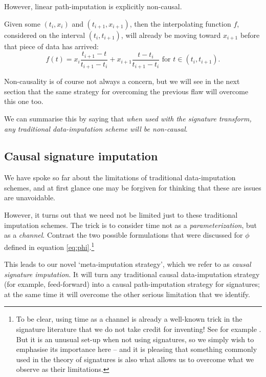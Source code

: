 \documentclass{article}
\begin{document}
However, linear path-imputation is explicitly non-causal.

Given some $(t_i, x_i)$ and $(t_{i+1}, x_{i + 1})$, then the interpolating function $f$, considered on the interval $(t_i, t_{i + 1})$, will already be moving toward $x_{i + 1}$ before that piece of data has arrived:
\begin{equation*}
    f(t) = x_{i} \frac{t_{i + 1} - t}{t_{i + 1} - t_i} + x_{i + 1} \frac{t - t_i}{t_{i + 1} - t_i}\text{ for }t \in (t_i, t_{i + 1}).
\end{equation*}

Non-causality is of course not always a concern, but we will see in the next section that the same strategy for overcoming the previous flaw will overcome this one too.

We can summarise this by saying that \emph{when used with the signature transform, any traditional data-imputation scheme will be non-causal}.


\subsection{Causal signature imputation}
We have spoke so far about the limitations of traditional data-imputation schemes, and at first glance one may be forgiven for thinking that these are issues are unavoidable. 

However, it turns out that we need not be limited just to these traditional imputation schemes. The trick is to consider time not as a \emph{parameterization}, but as a \emph{channel}. Contrast the two possible formulations that were discussed for $\phi$ defined in equation \eqref{eq:phi}.\footnote{To be clear, using time as a channel is already a well-known trick in the signature literature that we do not take credit for inventing! See for example \citep[Definition A.3]{kidger2019deep}. But it is an unusual set-up when not using signatures, so we simply wish to emphasise its importance here -- and it is pleasing that something commonly used in the theory of signatures is also what allows us to overcome what we observe as their limitations.}

This leads to our novel `meta-imputation strategy', which we refer to as \emph{causal signature imputation}. It will turn any traditional causal data-imputation strategy (for example, feed-forward) into a causal path-imputation strategy for signatures; at the same time it will overcome the other serious limitation that we identify.
\end{document}
